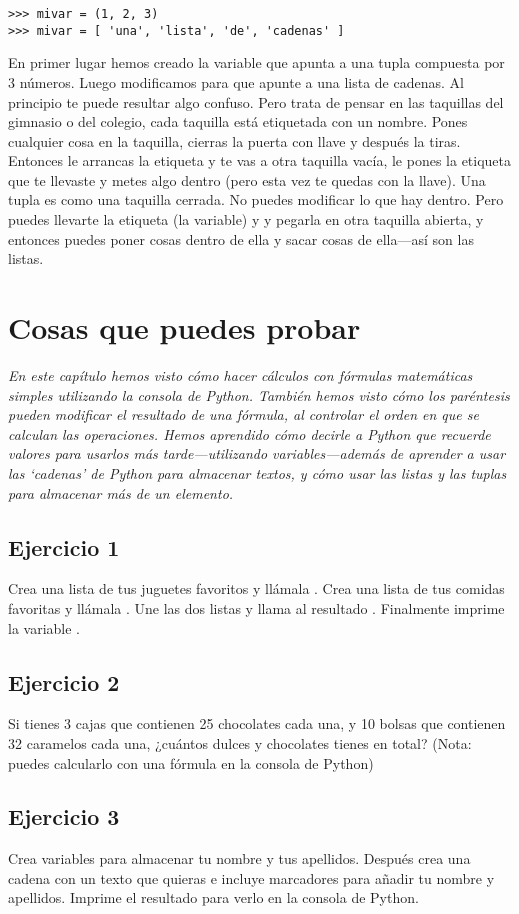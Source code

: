 \begin{listing}
\begin{verbatim}
>>> mivar = (1, 2, 3)
>>> mivar = [ 'una', 'lista', 'de', 'cadenas' ]
\end{verbatim}
\end{listing}

En primer lugar hemos creado la variable  que apunta a una tupla compuesta por 3 números. Luego modificamos  para que apunte a una lista de cadenas. Al principio te puede resultar algo confuso. Pero trata de pensar en las taquillas del gimnasio o del colegio, cada taquilla está etiquetada con un nombre. Pones cualquier cosa en la taquilla, cierras la puerta con llave y después la tiras. Entonces le arrancas la etiqueta y te vas a otra taquilla vacía, le pones la etiqueta que te llevaste y metes algo dentro (pero esta vez te quedas con la llave). Una tupla es como una taquilla cerrada. No puedes modificar lo que hay dentro. Pero puedes llevarte la etiqueta (la variable) y y pegarla en otra taquilla abierta, y entonces puedes poner cosas dentro de ella y sacar cosas de ella---así son las listas.

\section{Cosas que puedes probar}

\emph{En este capítulo hemos visto cómo hacer cálculos con fórmulas matemáticas simples utilizando la consola de Python. También hemos visto cómo los paréntesis pueden modificar el resultado de una fórmula, al controlar el orden en que se calculan las operaciones. Hemos aprendido cómo decirle a Python que recuerde valores para usarlos más tarde---utilizando variables---además de aprender a usar las `cadenas' de Python para almacenar textos, y cómo usar las listas y las tuplas para almacenar más de un elemento.}
\par

\subsection*{Ejercicio 1}
Crea una lista de tus juguetes favoritos y llámala . Crea una lista de tus comidas favoritas y llámala . Une las dos listas y llama al resultado . Finalmente imprime la variable .

\subsection*{Ejercicio 2}
Si tienes 3 cajas que contienen 25 chocolates cada una, y 10 bolsas que contienen 32 caramelos cada una, ¿cuántos dulces y chocolates tienes en total? (Nota: puedes calcularlo con una fórmula en la consola de Python)

\subsection*{Ejercicio 3}
Crea variables para almacenar tu nombre y tus apellidos. Después crea una cadena con un texto que quieras e incluye marcadores para añadir tu nombre y apellidos. Imprime el resultado para verlo en la consola de Python. 


\newpage
